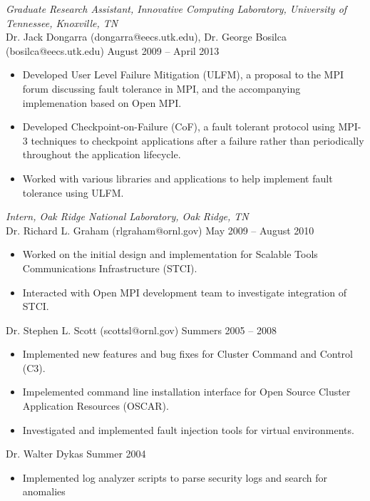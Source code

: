 \documentclass{article}
\begin{document}
{\sl Graduate Research Assistant, Innovative Computing Laboratory, University
of Tennessee, Knoxville, TN} \\
Dr. Jack Dongarra (dongarra@eecs.utk.edu), Dr. George Bosilca
(bosilca@eecs.utk.edu) \hfill August 2009 -- April 2013 
\begin{itemize} \itemsep -2pt %
        \item Developed User Level Failure Mitigation (ULFM), a proposal to
            the MPI forum discussing fault tolerance in MPI, and the
            accompanying implemenation based on Open MPI.
        \item Developed Checkpoint-on-Failure (CoF), a fault tolerant protocol
            using MPI-3 techniques to checkpoint applications after a failure
            rather than periodically throughout the application lifecycle.
        \item Worked with various libraries and applications to help
            implement fault tolerance using ULFM.
\end{itemize}

{\sl Intern, Oak Ridge National Laboratory, Oak Ridge, TN} \\
Dr. Richard L. Graham (rlgraham@ornl.gov) \hfill May 2009 -- August 2010 
\begin{itemize} \itemsep -2pt %
        \item Worked on the initial design and implementation for Scalable
            Tools Communications Infrastructure (STCI).
        \item Interacted with Open MPI development team to investigate
            integration of STCI.
\end{itemize} 
Dr. Stephen L. Scott (scottsl@ornl.gov) \hfill Summers 2005 -- 2008
\begin{itemize} \itemsep -2pt
        \item Implemented new features and bug fixes for Cluster Command and
            Control (C3).
        \item Impelemented command line installation interface for Open Source
            Cluster Application Resources (OSCAR).
        \item Investigated and implemented fault injection tools for virtual
            environments.
\end{itemize}
Dr. Walter Dykas \hfill Summer 2004
\begin{itemize} \itemsep -2pt
        \item Implemented log analyzer scripts to parse security logs and
            search for anomalies
\end{itemize}
\end{document}

